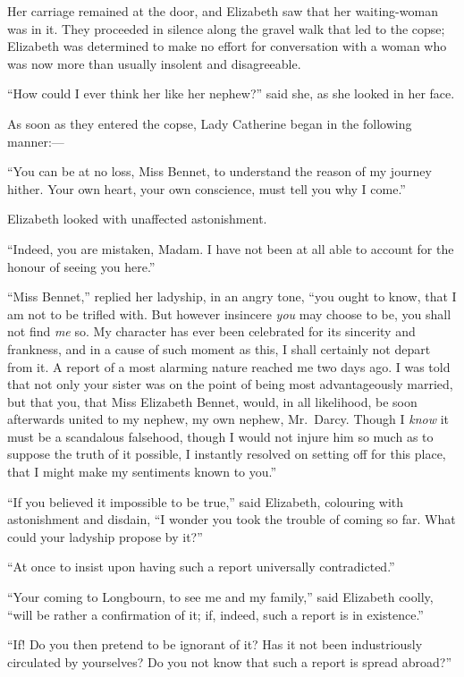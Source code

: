 Her carriage remained at the door, and Elizabeth saw that her
waiting-woman was in it.  They proceeded in silence along the
gravel walk that led to the copse; Elizabeth was determined to
make no effort for conversation with a woman who was now more
than usually insolent and disagreeable.

``How could I ever think her like her nephew?'' said she, as she
looked in her face.

As soon as they entered the copse, Lady Catherine began in the
following manner:---

``You can be at no loss, Miss Bennet, to understand the reason
of my journey hither.  Your own heart, your own conscience,
must tell you why I come.''

Elizabeth looked with unaffected astonishment.

``Indeed, you are mistaken, Madam.  I have not been at all able
to account for the honour of seeing you here.''

``Miss Bennet,'' replied her ladyship, in an angry tone, ``you
ought to know, that I am not to be trifled with.  But however
insincere \emph{you} may choose to be, you shall not find \emph{me} so.
My character has ever been celebrated for its sincerity and
frankness, and in a cause of such moment as this, I shall
certainly not depart from it.  A report of a most alarming
nature reached me two days ago.  I was told that not only your
sister was on the point of being most advantageously married,
but that you, that Miss Elizabeth Bennet, would, in all
likelihood, be soon afterwards united to my nephew, my own
nephew, Mr.\ Darcy.  Though I \emph{know} it must be a scandalous
falsehood, though I would not injure him so much as to suppose
the truth of it possible, I instantly resolved on setting off
for this place, that I might make my sentiments known to you.''

``If you believed it impossible to be true,'' said Elizabeth,
colouring with astonishment and disdain, ``I wonder you took the
trouble of coming so far.  What could your ladyship propose by
it?''

``At once to insist upon having such a report universally
contradicted.''

``Your coming to Longbourn, to see me and my family,'' said
Elizabeth coolly, ``will be rather a confirmation of it; if,
indeed, such a report is in existence.''

``If!  Do you then pretend to be ignorant of it?  Has it not
been industriously circulated by yourselves?  Do you not know
that such a report is spread abroad?''

